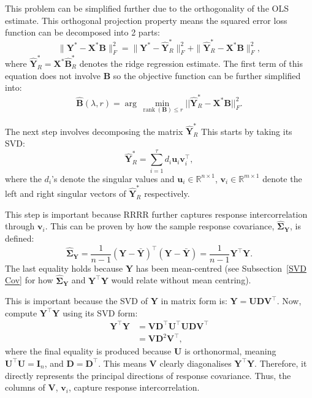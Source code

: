 \documentclass[11pt]{report} %
\begin{document}
This problem can be simplified further due to the orthogonality of the OLS estimate. This orthogonal projection property means the squared error loss function can be decomposed into 2 parts: 
\[\|\mathbf{Y}^* - \mathbf{X}^* \mathbf{B} \|_F^2 = \|\mathbf{Y}^* - \hat{\mathbf{Y}}^*_R \|_F^2 + \|\hat{\mathbf{Y}}^*_R - \mathbf{X}^* \mathbf{B} \|_F^2,\] 
where \( \hat{\mathbf{Y}}^*_R = \mathbf{X}^* \hat{\mathbf{B}}^*_R \) denotes the ridge regression estimate.\cite{mukherjee2011reduced} The first term of this equation does not involve $\mathbf{B}$ so the objective function can be further simplified into:
\begin{equation}
    \hat{\mathbf{B}}(\lambda, r) = \arg\min_{\operatorname{rank}(\mathbf{B}) \leq r} ||\hat{\mathbf{Y}}^*_R - \mathbf{X}^* \mathbf{B}||_{F}^2.
    \label{bhat}
\end{equation}

\noindent The next step involves decomposing the matrix \( \hat{\mathbf{Y}}^*_R\)
This starts by taking its SVD:
\[
    \hat{\mathbf{Y}}^*_R = \sum_{i=1}^{\tau} d_i \mathbf{u}_i \mathbf{v}_i^\top,
\]
where the \( d_i \)'s denote the singular values and \( \mathbf{u}_i \in \mathbb{R}^{n \times 1} \), \( \mathbf{v}_i \in \mathbb{R}^{m \times 1} \) denote the left and right singular vectors of \( \hat{\mathbf{Y}}^*_R \) respectively.\cite{mukherjee2011reduced} 

This step is important because RRRR further captures response intercorrelation through \( \mathbf{v}_i\). This can be proven by how the sample response covariance, $\mathbf{\hat{\Sigma}_Y}$, is defined:
\[
\mathbf{\hat{\Sigma}_Y}=\frac{1}{n-1}(\mathbf{Y}-\bar{\mathbf{Y}})^\top (\mathbf{Y}-\bar{\mathbf{Y}})=\frac{1}{n-1}\mathbf{Y}^\top\mathbf{Y}.
\]
The last equality holds because $\mathbf{Y}$ has been mean-centred
(see Subsection~\ref{SVD Cov} for how $\mathbf{\hat{\Sigma}_Y}$ and $\mathbf{Y}^\top\mathbf{Y}$ would relate without mean centring). 

This is important because the SVD of $\mathbf{Y}$ in matrix form is: $\mathbf{Y}=\mathbf{UDV}^\top$. Now, compute $\mathbf{Y^\top Y}$ using its SVD form:
\begin{equation*}
    \begin{aligned}
        \mathbf{Y^\top Y} &= \mathbf{VD^\top U^\top U DV^\top}\\ 
        &= \mathbf{VD}^2\mathbf{V^\top},
    \end{aligned}
\end{equation*}
\noindent where the final equality is produced because $\mathbf{U}$ is orthonormal, meaning $\mathbf{U^\top U}=\mathbf{I}_n$, and $\mathbf{D}=\mathbf{D^\top}$.\cite{jolliffe2002principal} This means $\mathbf{V}$ clearly diagonalises $\mathbf{Y^\top Y}$. Therefore, it directly represents the principal directions of response covariance. Thus, the columns of \( \mathbf{V} \), \( \mathbf{v}_i\), capture response intercorrelation.
\end{document}
